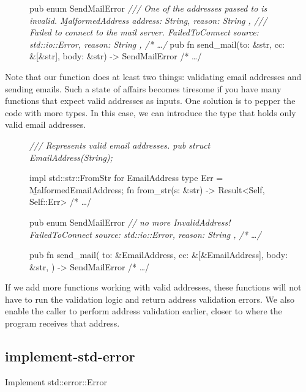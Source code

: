 \documentclass{article}
\begin{document}
\begin{figure}
\begin{code}[bad]
pub enum SendMailError {
  \em{/// One of the addresses passed to  is invalid.}
  \b{MalformedAddress} { address: String, reason: String },
  \em{/// Failed to connect to the mail server.}
  FailedToConnect { source: std::io::Error, reason: String },
  /* \ldots  */
}
pub fn send_mail(to: &str, cc: &[&str], body: &str) -> SendMailError { /* \ldots  */ }
\end{code}
\end{figure}

Note that our  function does at least two things: validating email addresses and sending emails.
Such a state of affairs becomes tiresome if you have many functions that expect valid addresses as inputs.
One solution is to pepper the code with more types.
In this case, we can introduce the  type that holds only valid email addresses.

\begin{figure}
\begin{code}[good]
\em{/// Represents valid email addresses}.
pub struct EmailAddress(String);

impl std::str::FromStr for EmailAddress {
  type Err = \b{MalformedEmailAddress};
  fn from_str(s: &str) -> Result<Self, Self::Err> { /* \ldots  */ }
}

pub enum SendMailError {
  \em{// no more InvalidAddress!}
  FailedToConnect { source: std::io::Error, reason: String },
  /* \ldots  */
}

pub fn send_mail(
    to: &EmailAddress,
    cc: &[&EmailAddress],
    body: &str,
) -> SendMailError { /* \ldots  */ }
\end{code}
\end{figure}

If we add more functions working with valid addresses, these functions will not have to run the validation logic and return address validation errors.
We also enable the caller to perform address validation earlier, closer to where the program receives that address.

\subsection{implement-std-error}{Implement std::error::Error}
\end{document}

